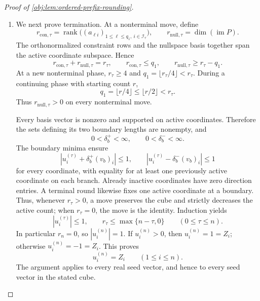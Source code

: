 \documentclass[11pt]{article}
\begin{document}
\begin{proof}[Proof of \cref{obj:lem:ordered-prefix-rounding}]
\begin{enumerate}
Thus induction over the finite move recursion gives joint Borel measurability of \(u^{(n)}\). In particular,
\[
\{(a,\boldsymbol\eta):Z_i(a,\boldsymbol\eta)=1\}
=
\{(a,\boldsymbol\eta):u_i^{(n)}(a,\boldsymbol\eta)>0\}
\]
is Borel for every coordinate. Since the sign space is finite, the output map is jointly Borel. When \(n=0\), it is the constant map into the singleton empty sign space.

\item
We next prove termination. At a nonterminal move, define
\[
r_{\mathrm{con},\tau}
=\operatorname{rank}\bigl((a_{\ell i})_{1\leq\ell\leq q_1,\ i\in\mathcal I_\tau}\bigr),
\qquad
r_{\mathrm{null},\tau}=\dim(\operatorname{im}P).
\]
The orthonormalized constraint rows and the nullspace basis together span the active coordinate subspace. Hence
\[
r_{\mathrm{con},\tau}+r_{\mathrm{null},\tau}=r_\tau,
\qquad
r_{\mathrm{con},\tau}\leq q_1,
\qquad
r_{\mathrm{null},\tau}\geq r_\tau-q_1.
\]
At a new nonterminal phase, \(r_\tau\geq4\) and
\(q_1=\lfloor r_\tau/4\rfloor<r_\tau\). During a continuing phase with starting count \(r\),
\[
q_1=\lfloor r/4\rfloor
\leq\lfloor r/2\rfloor<r_\tau.
\]
Thus \(r_{\mathrm{null},\tau}>0\) on every nonterminal move.

Every basis vector is nonzero and supported on active coordinates. Therefore the sets defining its two boundary lengths are nonempty, and
\[
0<\delta_b^+<\infty,\qquad
0<\delta_b^-<\infty.
\]
The boundary minima ensure
\[
|u_i^{(\tau)}+\delta_b^+(v_b)_i|\leq1,
\qquad
|u_i^{(\tau)}-\delta_b^-(v_b)_i|\leq1
\]
for every coordinate, with equality for at least one previously active coordinate on each branch. Already inactive coordinates have zero direction entries. A terminal round likewise fixes one active coordinate at a boundary. Thus, whenever \(r_\tau>0\), a move preserves the cube and strictly decreases the active count; when \(r_\tau=0\), the move is the identity. Induction yields
\[
|u_i^{(\tau)}|\leq1,
\qquad
r_\tau\leq\max\{n-\tau,0\}
\qquad(0\leq\tau\leq n).
\]
In particular \(r_n=0\), so \(|u_i^{(n)}|=1\). If \(u_i^{(n)}>0\), then \(u_i^{(n)}=1=Z_i\); otherwise \(u_i^{(n)}=-1=Z_i\). This proves
\[
u_i^{(n)}=Z_i
\qquad(1\leq i\leq n).
\]
The argument applies to every real seed vector, and hence to every seed vector in the stated cube.


\end{enumerate}
\end{proof}
\end{document}
